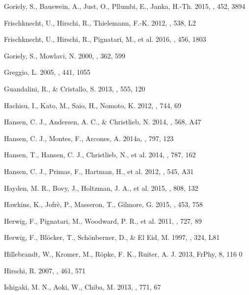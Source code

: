 \documentclass[manuscript]{aastex}
\begin{document}
\begin{thebibliography}{}
Goriely, S., Bauswein, A., Just, O., Pllumbi, E., Janka, H.-Th. 2015,
\mnras, 452, 3894

Frischknecht, U., Hirschi, R., Thielemann, F.-K. 2012, \aap, 538, L2

Frischknecht, U., Hirschi, R., Pignatari, M., et al. 2016, \mnras, 456, 1803

Goriely, S., Mowlavi, N. 2000, \aap, 362, 599

Greggio, L. 2005, \aap, 441, 1055

Guandalini, R., \& Cristallo, S. 2013, \aap, 555, 120

Hachisu, I., Kato, M., Saio, H., Nomoto, K. 2012, \apj, 744, 69

Hansen, C. J., Andersen, A. C., \& Christlieb, N. 2014, \aap, 568, A47

Hansen, C. J., Montes, F., Arcones, A. 2014a, \apj, 797, 123

Hansen, T., Hansen, C. J., Christlieb, N., et al. 2014, \apj, 787, 162

Hansen, C. J., Primas, F., Hartman, H., et al. 2012, \aap, 545, A31

Hayden, M. R., Bovy, J., Holtzman, J. A., et al. 2015, \apj, 808, 132

Hawkins, K., Jofr{\`e}, P., Masseron, T., Gilmore, G. 2015, \mnras, 453, 758

Herwig, F., Pignatari, M., Woodward, P. R., et al. 2011, \apj, 727, 89

 Herwig, F., 
Bl{\"o}cker, T., Sch{\"o}nberner, D., \& El Eid, M. 1997, \aap, 324, L81

Hillebrandt, W., Kromer, M., R{\"o}pke, F. K., Ruiter, A. J.
2013, FrPhy, 8, 116 0

Hirschi, R. 2007, \aap, 461, 571

Ishigaki, M. N., Aoki, W., Chiba, M. 2013, \apj, 771, 67


\end{thebibliography}
\end{document}
